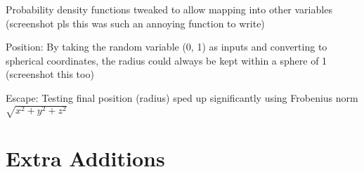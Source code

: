 \documentclass{notes}
\begin{document}
Probability density functions tweaked to allow mapping into other variables (screenshot pls this was such an annoying function to write)

Position: By taking the random variable (0, 1) as inputs and converting to spherical coordinates, the radius could always be kept within a sphere of 1 (screenshot this too)

Escape: Testing final position (radius) sped up significantly using Frobenius norm \(\sqrt{x^2+y^2+z^2}\)

\section{Extra Additions}
\end{document}

